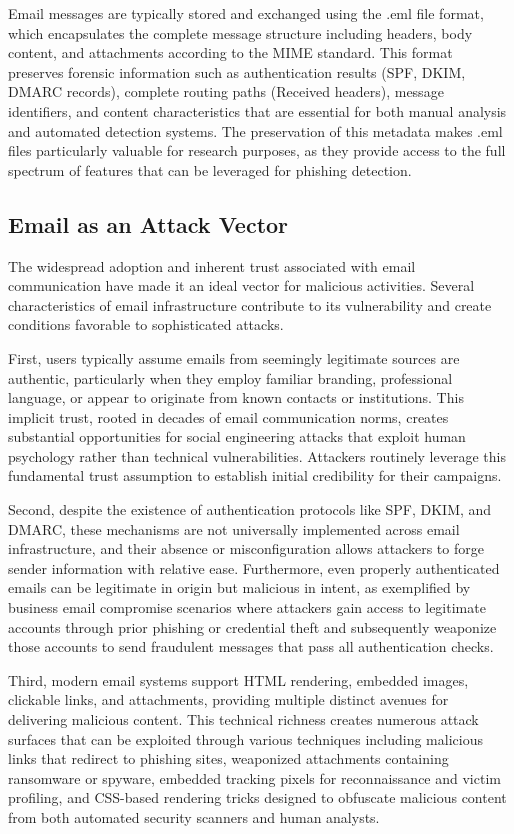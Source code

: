 Email messages are typically stored and exchanged using the .eml file format, which encapsulates the complete message structure including headers, body content, and attachments according to the \ac{MIME} standard. This format preserves forensic information such as authentication results (\ac{SPF}, \ac{DKIM}, \ac{DMARC} records), complete routing paths (Received headers), message identifiers, and content characteristics that are essential for both manual analysis and automated detection systems. The preservation of this metadata makes .eml files particularly valuable for research purposes, as they provide access to the full spectrum of features that can be leveraged for phishing detection.

\subsection{Email as an Attack Vector}

The widespread adoption and inherent trust associated with email communication have made it an ideal vector for malicious activities. Several characteristics of email infrastructure contribute to its vulnerability and create conditions favorable to sophisticated attacks.

First, users typically assume emails from seemingly legitimate sources are authentic, particularly when they employ familiar branding, professional language, or appear to originate from known contacts or institutions. This implicit trust, rooted in decades of email communication norms, creates substantial opportunities for social engineering attacks that exploit human psychology rather than technical vulnerabilities. Attackers routinely leverage this fundamental trust assumption to establish initial credibility for their campaigns.

Second, despite the existence of authentication protocols like \ac{SPF}, \ac{DKIM}, and \ac{DMARC}, these mechanisms are not universally implemented across email infrastructure, and their absence or misconfiguration allows attackers to forge sender information with relative ease. Furthermore, even properly authenticated emails can be legitimate in origin but malicious in intent, as exemplified by business email compromise scenarios where attackers gain access to legitimate accounts through prior phishing or credential theft and subsequently weaponize those accounts to send fraudulent messages that pass all authentication checks.

Third, modern email systems support \ac{HTML} rendering, embedded images, clickable links, and attachments, providing multiple distinct avenues for delivering malicious content. This technical richness creates numerous attack surfaces that can be exploited through various techniques including malicious links that redirect to phishing sites, weaponized attachments containing ransomware or spyware, embedded tracking pixels for reconnaissance and victim profiling, and CSS-based rendering tricks designed to obfuscate malicious content from both automated security scanners and human analysts.

